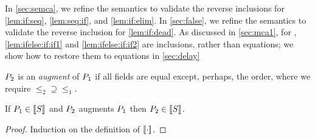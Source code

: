 In \textsection\ref{sec:semca}, we refine the semantics to validate the
reverse inclusions for \eqref{lem:if:seq}, \eqref{lem:seq:if}, and
\eqref{lem:if:elim}.
In \textsection\ref{sec:false}, we refine the semantics to validate the
reverse inclusion for \eqref{lem:if:dead}.
As discussed in \textsection\ref{sec:mca1}, for \PwTmca{},
\eqref{lem:ifelse:if:if1} and \eqref{lem:ifelse:if:if2} are 
inclusions, rather than equations; we show how to restore them to equations
in \textsection\ref{sec:delay}
\begin{definition}
  \label{def:augment}
  $P_2$ is an \emph{augment} of $P_1$ if all fields are equal except,
  perhaps, the order, where we require ${\le_2}\supseteq{\le_1}$.
\end{definition}
\begin{lemma}
  If $\aPS_1\in\sembase{\aCmd}$ and $P_2$  augments $P_1$ then $\aPS_2\in\sembase{\aCmd}$.

  \vspace{-.5\baselineskip}
  \begin{proof}
    Induction on the definition of $\sembase{}$.
  \end{proof}
\end{lemma}






